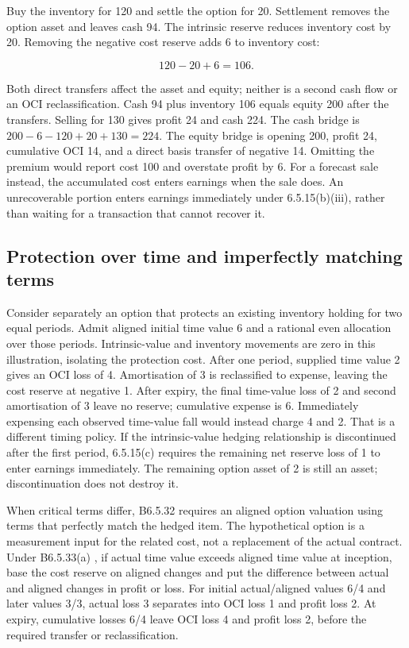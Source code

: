 Buy the inventory for 120 and settle the option for 20. Settlement removes the option asset and leaves cash 94. The intrinsic reserve reduces inventory cost by 20. Removing the negative cost reserve adds 6 to inventory cost:

\[120 - 20 + 6 = 106.\]

Both direct transfers affect the asset and equity; neither is a second cash flow or an OCI reclassification. Cash 94 plus inventory 106 equals equity 200 after the transfers. Selling for 130 gives profit 24 and cash 224. The cash bridge is \(200-6-120+20+130=224\). The equity bridge is opening 200, profit 24, cumulative OCI 14, and a direct basis transfer of negative 14. Omitting the premium would report cost 100 and overstate profit by 6. For a forecast sale instead, the accumulated cost enters earnings when the sale does. An unrecoverable portion enters earnings immediately under 6.5.15(b)(iii), rather than waiting for a transaction that cannot recover it.

\hypertarget{protection-over-time-and-imperfectly-matching-terms}{%
\subsection{Protection over time and imperfectly matching terms}\label{protection-over-time-and-imperfectly-matching-terms}}

Consider separately an option that protects an existing inventory holding for two equal periods. Admit aligned initial time value 6 and a rational even allocation over those periods. Intrinsic-value and inventory movements are zero in this illustration, isolating the protection cost. After one period, supplied time value 2 gives an OCI loss of 4. Amortisation of 3 is reclassified to expense, leaving the cost reserve at negative 1. After expiry, the final time-value loss of 2 and second amortisation of 3 leave no reserve; cumulative expense is 6. Immediately expensing each observed time-value fall would instead charge 4 and 2. That is a different timing policy. If the intrinsic-value hedging relationship is discontinued after the first period, 6.5.15(c) requires the remaining net reserve loss of 1 to enter earnings immediately. The remaining option asset of 2 is still an asset; discontinuation does not destroy it.

When critical terms differ, B6.5.32 requires an aligned option valuation using terms that perfectly match the hedged item. The hypothetical option is a measurement input for the related cost, not a replacement of the actual contract. Under B6.5.33(a) \citep[B6.5.32--33]{aasb9dated}, if actual time value exceeds aligned time value at inception, base the cost reserve on aligned changes and put the difference between actual and aligned changes in profit or loss. For initial actual/aligned values 6/4 and later values 3/3, actual loss 3 separates into OCI loss 1 and profit loss 2. At expiry, cumulative losses 6/4 leave OCI loss 4 and profit loss 2, before the required transfer or reclassification.

